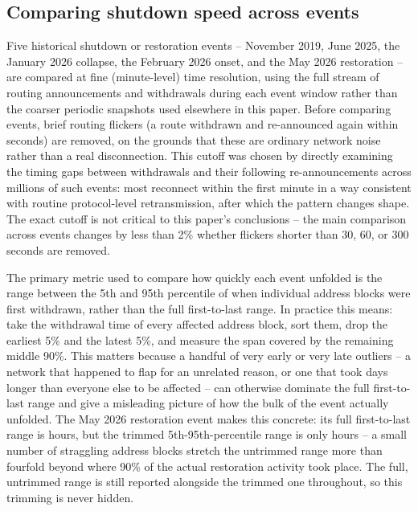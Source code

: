 \subsection{Comparing shutdown speed across events}

Five historical shutdown or restoration events -- November 2019, June
2025, the January 2026 collapse, the February 2026 onset, and the May 2026
restoration -- are compared at fine (minute-level) time resolution, using
the full stream of
routing announcements and withdrawals during each event window rather than
the coarser periodic snapshots used elsewhere in this paper. Before
comparing events, brief routing flickers (a route withdrawn and
re-announced again within \flapThresholdSeconds{} seconds) are removed, on
the grounds that these are ordinary network noise rather than a real
disconnection. This cutoff was chosen by directly examining the timing
gaps between withdrawals and their following re-announcements across
millions of such events: most reconnect within the first minute in a way
consistent with routine protocol-level retransmission, after which the
pattern changes shape. The exact cutoff is not critical to this paper's
conclusions -- the main comparison across events changes by less than 2\%
whether flickers shorter than 30, 60, or 300 seconds are removed.

The primary metric used to compare how quickly each event unfolded is the
range between the 5th and 95th percentile of when individual address
blocks were first withdrawn, rather than the full first-to-last range. In
practice this means: take the withdrawal time of every affected address
block, sort them, drop the earliest 5\% and the latest 5\%, and measure the
span covered by the remaining middle 90\%. This matters because a handful
of very early or very late outliers -- a network that happened to flap for
an unrelated reason, or one that took days longer than everyone else to be
affected -- can otherwise dominate the full first-to-last range and give a
misleading picture of how the bulk of the event actually unfolded. The May
2026 restoration event makes this concrete: its full first-to-last range
is \durationMayRestorationFullRangeHours{} hours, but the trimmed
5th-95th-percentile range is only \durationMayRestorationRangeHours{}
hours -- a small number of straggling address blocks stretch the untrimmed
range more than fourfold beyond where 90\% of the actual restoration
activity took place. The full, untrimmed range is still reported alongside
the trimmed one throughout, so this trimming is never hidden.

